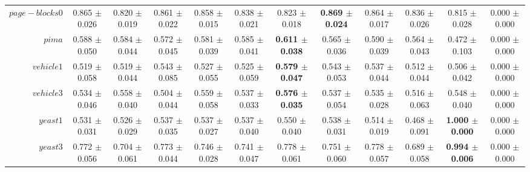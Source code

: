 \begin{table}[!ht]
{\begin{tabular}{r c c c c c c c c c c c}
$page-blocks0$ & 0.865 $\pm$ 0.026 & 0.820 $\pm$ 0.019 & 0.861 $\pm$ 0.022 & 0.858 $\pm$ 0.015 & 0.838 $\pm$ 0.021 & 0.823 $\pm$ 0.018 & \textbf{0.869 $\pm$ 0.024} & 0.864 $\pm$ 0.017 & 0.836 $\pm$ 0.026 & 0.815 $\pm$ 0.028 & 0.000 $\pm$ 0.000 \\
$pima$ & 0.588 $\pm$ 0.050 & 0.584 $\pm$ 0.044 & 0.572 $\pm$ 0.045 & 0.581 $\pm$ 0.039 & 0.585 $\pm$ 0.041 & \textbf{0.611 $\pm$ 0.038} & 0.565 $\pm$ 0.036 & 0.590 $\pm$ 0.039 & 0.564 $\pm$ 0.043 & 0.472 $\pm$ 0.103 & 0.000 $\pm$ 0.000 \\
$vehicle1$ & 0.519 $\pm$ 0.058 & 0.519 $\pm$ 0.044 & 0.543 $\pm$ 0.085 & 0.527 $\pm$ 0.055 & 0.525 $\pm$ 0.059 & \textbf{0.579 $\pm$ 0.047} & 0.543 $\pm$ 0.053 & 0.537 $\pm$ 0.044 & 0.512 $\pm$ 0.044 & 0.506 $\pm$ 0.042 & 0.000 $\pm$ 0.000 \\
$vehicle3$ & 0.534 $\pm$ 0.046 & 0.558 $\pm$ 0.040 & 0.504 $\pm$ 0.044 & 0.559 $\pm$ 0.058 & 0.537 $\pm$ 0.033 & \textbf{0.576 $\pm$ 0.035} & 0.537 $\pm$ 0.054 & 0.535 $\pm$ 0.028 & 0.516 $\pm$ 0.063 & 0.548 $\pm$ 0.040 & 0.000 $\pm$ 0.000 \\
$yeast1$ & 0.531 $\pm$ 0.031 & 0.526 $\pm$ 0.029 & 0.537 $\pm$ 0.035 & 0.537 $\pm$ 0.027 & 0.537 $\pm$ 0.040 & 0.550 $\pm$ 0.040 & 0.538 $\pm$ 0.031 & 0.514 $\pm$ 0.019 & 0.468 $\pm$ 0.091 & \textbf{1.000 $\pm$ 0.000} & 0.000 $\pm$ 0.000 \\
$yeast3$ & 0.772 $\pm$ 0.056 & 0.704 $\pm$ 0.061 & 0.773 $\pm$ 0.044 & 0.746 $\pm$ 0.028 & 0.741 $\pm$ 0.047 & 0.778 $\pm$ 0.061 & 0.751 $\pm$ 0.060 & 0.778 $\pm$ 0.057 & 0.689 $\pm$ 0.058 & \textbf{0.994 $\pm$ 0.006} & 0.000 $\pm$ 0.000 \\
\end{tabular}}
\end{table}
